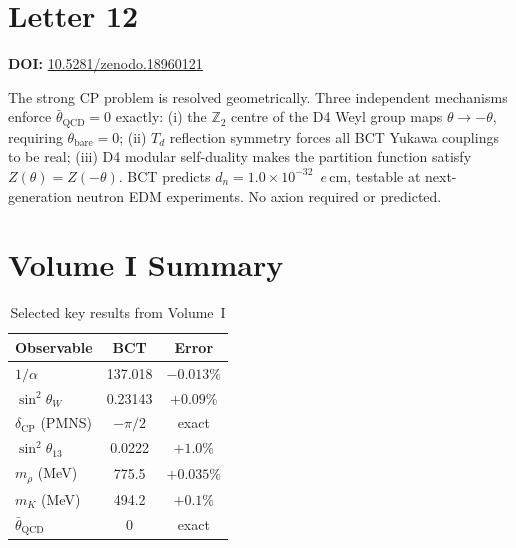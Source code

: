 \documentclass[aps,prl,twocolumn,showpacs,preprintnumbers]{revtex4-2}
\begin{document}
\section{Letter 12}
\noindent\textbf{DOI:} \href{https://doi.org/10.5281/zenodo.18960121}{10.5281/zenodo.18960121}

\medskip
The strong CP problem is resolved geometrically. Three independent
mechanisms enforce $\bar{\theta}_{\mathrm{QCD}} = 0$ exactly:
(i) the $\mathbb{Z}_2$ centre of the D4 Weyl group maps
$\theta \to -\theta$, requiring $\theta_{\mathrm{bare}} = 0$;
(ii) $T_d$ reflection symmetry forces all BCT Yukawa couplings
to be real; (iii) D4 modular self-duality makes the partition
function satisfy $Z(\theta) = Z(-\theta)$.
BCT predicts $d_n = 1.0 \times 10^{-32}$~$e$\,cm, testable at
next-generation neutron EDM experiments. No axion required or predicted.
%

\section*{Volume I Summary}

\begin{table}[h]
\centering
\caption{Selected key results from Volume~I}
\begin{tabular}{lcc}
\toprule
Observable & BCT & Error \\
\midrule
$1/\alpha$ & 137.018 & $-0.013\%$ \\
$\sin^2\theta_W$ & 0.23143 & $+0.09\%$ \\
$\delta_{\mathrm{CP}}$ (PMNS) & $-\pi/2$ & exact \\
$\sin^2\theta_{13}$ & 0.0222 & $+1.0\%$ \\
$m_\rho$ (MeV) & 775.5 & $+0.035\%$ \\
$m_K$ (MeV) & 494.2 & $+0.1\%$ \\
$\bar{\theta}_{\mathrm{QCD}}$ & 0 & exact \\
\bottomrule
\end{tabular}
\end{table}
\end{document}
